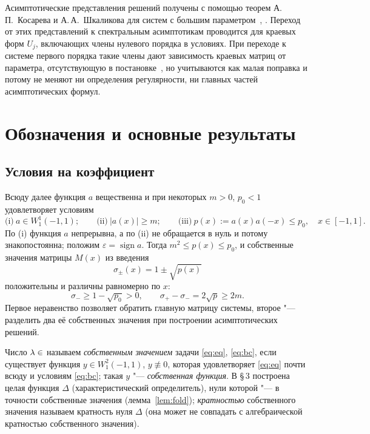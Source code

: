 \documentclass[12pt,a4paper]{article}
\numberwithin{equation}{section}
\theoremstyle{definition}
\let\C\relax\newcommand{\C}{\mathbb C}
\newcommand{\abs}[1]{\lvert#1\rvert}
\begin{document}
Асимптотические представления решений получены с помощью теорем А.\,П.~Косарева и
А.\,А.~Шкаликова для систем с большим параметром~\cite[теорема~1.5]{KS1},
\cite[теорема~1.2]{KS2}. Переход от этих представлений к спектральным асимптотикам
проводится для краевых форм $U_j$, включающих члены нулевого порядка в условиях.
При переходе к системе первого порядка такие члены дают зависимость краевых матриц от
параметра, отсутствующую в постановке~\cite{Sh}, но учитываются как малая поправка и
потому не меняют ни определения регулярности, ни главных частей асимптотических формул.

\section{Обозначения и основные результаты}

\subsection{Условия на коэффициент}\label{ss:H}

Всюду далее функция $a$ вещественна и при некоторых $m>0$, $p_0<1$ удовлетворяет условиям
\begin{equation}\label{eq:H}
 \text{(i)}\ a\in W^1_1(-1,1);\qquad
 \text{(ii)}\ \abs{a(x)}\ge m;\qquad
 \text{(iii)}\ p(x):=a(x)a(-x)\le p_0,\quad x\in[-1,1].
\end{equation}
По (i) функция $a$ непрерывна, а по (ii) не обращается в нуль и потому знакопостоянна;
положим $\varepsilon=\operatorname{sign}a$. Тогда $m^2\le p(x)\le p_0$, и собственные значения
матрицы $M(x)$ из введения
\[
 \sigma_\pm(x)=1\pm\sqrt{p(x)}
\]
положительны и различны равномерно по $x$:
\[
 \sigma_-\ge1-\sqrt{p_0}>0,\qquad \sigma_+-\sigma_-=2\sqrt p\ge2m.
\]
Первое неравенство позволяет обратить главную матрицу системы, второе "--- разделить
два её собственных значения при построении асимптотических решений.

Число $\lambda\in\C$ называем \emph{собственным значением} задачи \eqref{eq:eq}, \eqref{eq:bc},
если существует функция $y\in W^2_1(-1,1)$, $y\not\equiv0$, которая удовлетворяет \eqref{eq:eq}
почти всюду и условиям \eqref{eq:bc}; такая $y$ "--- \emph{собственная функция}. В \S\,3
построена целая функция $\Delta$ (характеристический определитель), нули которой "--- в точности
собственные значения (лемма~\ref{lem:fold}); \emph{кратностью} собственного значения называем
кратность нуля $\Delta$ (она может не совпадать с алгебраической кратностью собственного
значения). 
\end{document}
